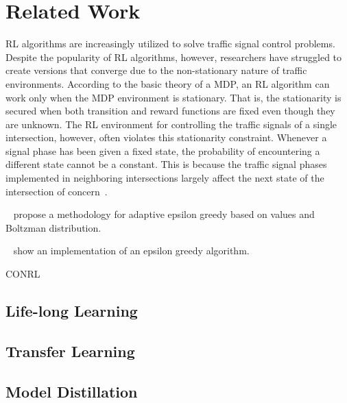 
\section{Related Work}
\label{sec:related}


\ac{RL} algorithms are increasingly utilized to solve traffic signal control problems. Despite the popularity 
of RL algorithms, however, researchers have struggled to create versions that converge due to the 
non-stationary nature of traffic environments. According to the basic theory of a \ac{MDP}, an \ac{RL} 
algorithm can work only when the \ac{MDP} environment is stationary.
That is, the stationarity is secured when both transition and reward functions are fixed even though they 
are unknown. The \ac{RL} environment for controlling the traffic signals of a single intersection, 
however, often violates this stationarity constraint. Whenever a signal phase has been given a fixed 
state, the probability of encountering a different state cannot be a constant. This is because the traffic 
signal phases implemented in neighboring intersections largely affect the next state of the intersection 
of concern~\cite{meta-rl-traffic}.

~\citet{tokic2010} propose a methodology for adaptive epsilon greedy based on values and Boltzman distribution.

~\citet{mignon2017adaptive} show an implementation of an epsilon greedy algorithm.

\ac{CONRL}~\cite{gueriau19}

\subsection{Life-long Learning}


\subsection{Transfer Learning}


\subsection{Model Distillation}


\endinput

